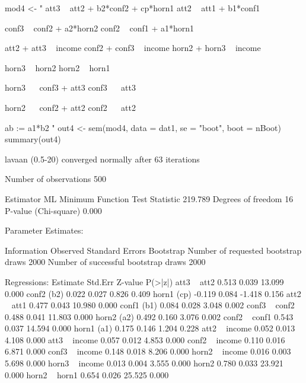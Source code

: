 \begin{Schunk}
\begin{Sinput}
 mod4 <- "
 att3 ~ att2 + b2*conf2 + cp*horn1
 att2 ~ att1 + b1*conf1
 
 conf3 ~ conf2 + a2*horn2
 conf2 ~ conf1 + a1*horn1
 
 att2 + att3 ~ income
 conf2 + conf3 ~ income 
 horn2 + horn3 ~ income
 
 horn3 ~ horn2
 horn2 ~ horn1
 
 horn3 ~~ conf3 + att3
 conf3 ~~ att3
 
 horn2 ~~ conf2 + att2
 conf2 ~~ att2
 
 ab := a1*b2
 "
 out4 <- sem(mod4, data = dat1, se = "boot", boot = nBoot)
 summary(out4)
\end{Sinput}
\begin{Soutput}
lavaan (0.5-20) converged normally after  63 iterations

  Number of observations                           500

  Estimator                                         ML
  Minimum Function Test Statistic              219.789
  Degrees of freedom                                16
  P-value (Chi-square)                           0.000

Parameter Estimates:

  Information                                 Observed
  Standard Errors                            Bootstrap
  Number of requested bootstrap draws             2000
  Number of successful bootstrap draws            2000

Regressions:
                   Estimate  Std.Err  Z-value  P(>|z|)
  att3 ~                                              
    att2              0.513    0.039   13.099    0.000
    conf2     (b2)    0.022    0.027    0.826    0.409
    horn1     (cp)   -0.119    0.084   -1.418    0.156
  att2 ~                                              
    att1              0.477    0.043   10.980    0.000
    conf1     (b1)    0.084    0.028    3.048    0.002
  conf3 ~                                             
    conf2             0.488    0.041   11.803    0.000
    horn2     (a2)    0.492    0.160    3.076    0.002
  conf2 ~                                             
    conf1             0.543    0.037   14.594    0.000
    horn1     (a1)    0.175    0.146    1.204    0.228
  att2 ~                                              
    income            0.052    0.013    4.108    0.000
  att3 ~                                              
    income            0.057    0.012    4.853    0.000
  conf2 ~                                             
    income            0.110    0.016    6.871    0.000
  conf3 ~                                             
    income            0.148    0.018    8.206    0.000
  horn2 ~                                             
    income            0.016    0.003    5.698    0.000
  horn3 ~                                             
    income            0.013    0.004    3.555    0.000
    horn2             0.780    0.033   23.921    0.000
  horn2 ~                                             
    horn1             0.654    0.026   25.525    0.000


\end{Soutput}
\end{Schunk}

